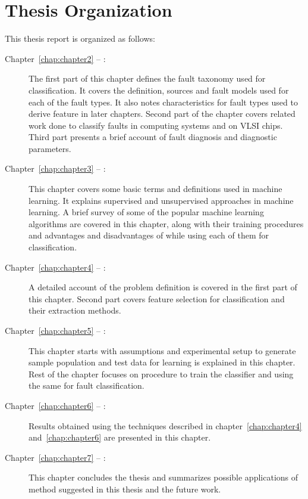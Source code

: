\section{Thesis Organization}
This thesis report is organized as follows:
\begin{description}
\item[Chapter~\ref{chap:chapter2} -- :] The first part of this chapter defines the fault taxonomy used for classification. It covers the definition, sources and fault models used for each of the fault types. It also notes characteristics for fault types used to derive feature in later chapters. Second part of the chapter covers related work done to classify faults in computing systems and on VLSI chips. Third part presents a brief account of fault diagnosis and diagnostic parameters.

\item[Chapter~\ref{chap:chapter3} -- :] This chapter covers some basic terms and definitions used in machine learning. It explains supervised and unsupervised approaches in machine learning. A brief survey of some of the popular machine learning algorithms are covered in this chapter, along with their training procedures and advantages and disadvantages of while using each of them for classification.
 
\item[Chapter~\ref{chap:chapter4} -- :] A detailed account of the problem definition is covered in the first part of this chapter. Second part covers feature selection for classification and their extraction methods.

\item[Chapter~\ref{chap:chapter5} -- :] This chapter starts with assumptions and experimental setup to generate sample population and test data for learning is explained in this chapter. Rest of the chapter focuses on procedure to train the classifier and using the same for fault classification.

\item[Chapter~\ref{chap:chapter6} -- :] Results obtained using the techniques described in chapter~\ref{chap:chapter4} and~\ref{chap:chapter6} are presented in this chapter.

\item[Chapter~\ref{chap:chapter7} -- :] This chapter concludes the thesis and summarizes possible applications of method suggested in this thesis and the future work.
\end{description}
